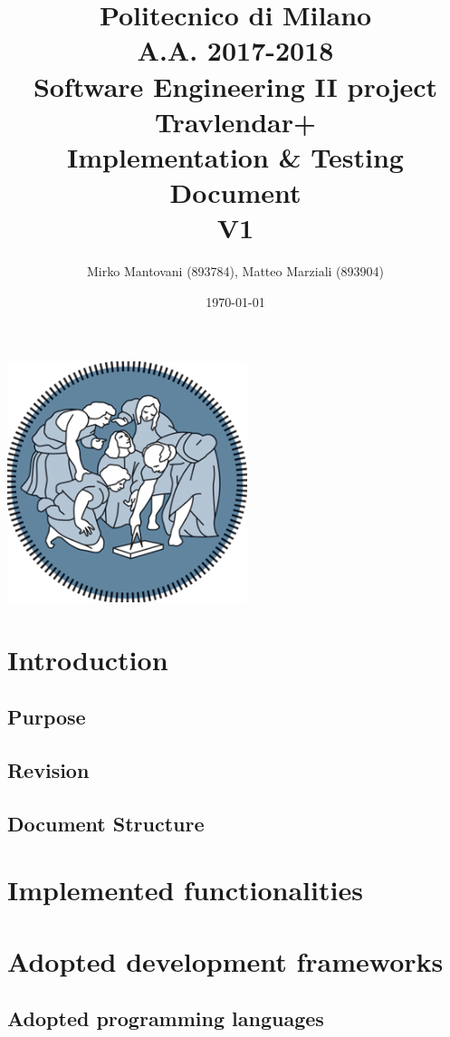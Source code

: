 \documentclass{article}
\author{Mirko Mantovani (893784), Matteo Marziali (893904)}
\date{\today}
\title{Politecnico di Milano
	\\A.A. 2017\@-\@2018
	\\Software Engineering II project \\ \textbf{Travlendar+}
	\\
	\textbf{I}mplementation \& \textbf{T}esting 
	\\ \textbf{D}ocument 
	\\
	\textbf{V1}}
\begin{document}
\maketitle
\begin{center}
	\includegraphics[width=7cm]{polimi-logo}
\end{center}
\clearpage
{\hypersetup{hidelinks}\tableofcontents}

\clearpage

\section{Introduction}
\subsection{Purpose}

\subsection{Revision}

\subsection{Document Structure}


\clearpage
\section{Implemented functionalities}


\clearpage
\section{Adopted development frameworks}
\subsection{Adopted programming languages}
\end{document}
